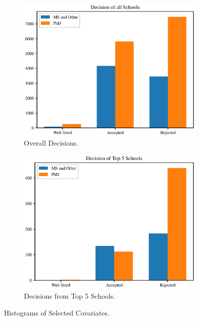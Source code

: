 \documentclass{article}
\begin{document}
\begin{figure}[h]
\begin{subfigure}{.5\linewidth}
	\includegraphics[width=\textwidth]{all_decision.eps}
	\caption{Overall Decisions.}
    \end{subfigure}%
    \begin{subfigure}{.5\linewidth}\centering
	\includegraphics[width=\textwidth]{top5_decision.eps}
	\caption{Decisions from Top 5 Schools.}
    \end{subfigure}%
    \caption{Histograms of Selected Covariates.}  \label{fig:dataset}
\end{figure}
\end{document}

